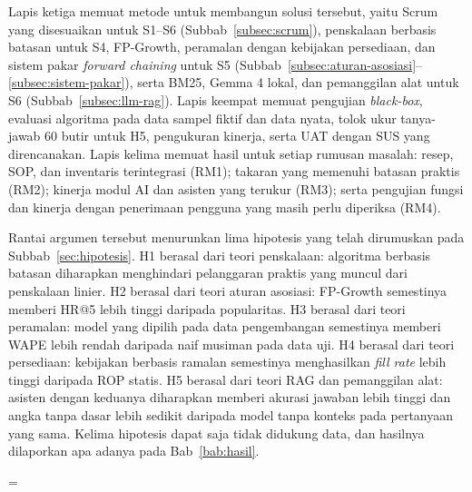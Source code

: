 Lapis ketiga memuat metode untuk membangun solusi tersebut, yaitu Scrum yang disesuaikan untuk S1--S6 (Subbab~\ref{subsec:scrum}), penskalaan berbasis batasan untuk S4, FP-Growth, peramalan dengan kebijakan persediaan, dan sistem pakar \textit{forward chaining} untuk S5 (Subbab~\ref{subsec:aturan-asosiasi}--\ref{subsec:sistem-pakar}), serta BM25, Gemma 4 lokal, dan pemanggilan alat untuk S6 (Subbab~\ref{subsec:llm-rag}). Lapis keempat memuat pengujian \textit{black-box}, evaluasi algoritma pada data sampel fiktif dan data nyata, tolok ukur tanya-jawab 60 butir untuk H5, pengukuran kinerja, serta UAT dengan SUS yang direncanakan. Lapis kelima memuat hasil untuk setiap rumusan masalah: resep, SOP, dan inventaris terintegrasi (RM1); takaran yang memenuhi batasan praktis (RM2); kinerja modul AI dan asisten yang terukur (RM3); serta pengujian fungsi dan kinerja dengan penerimaan pengguna yang masih perlu diperiksa (RM4).

Rantai argumen tersebut menurunkan lima hipotesis yang telah dirumuskan pada Subbab~\ref{sec:hipotesis}. H1 berasal dari teori penskalaan: algoritma berbasis batasan diharapkan menghindari pelanggaran praktis yang muncul dari penskalaan linier. H2 berasal dari teori aturan asosiasi: FP-Growth semestinya memberi HR@5 lebih tinggi daripada popularitas. H3 berasal dari teori peramalan: model yang dipilih pada data pengembangan semestinya memberi WAPE lebih rendah daripada naif musiman pada data uji. H4 berasal dari teori persediaan: kebijakan berbasis ramalan semestinya menghasilkan \textit{fill rate} lebih tinggi daripada ROP statis. H5 berasal dari teori RAG dan pemanggilan alat: asisten dengan keduanya diharapkan memberi akurasi jawaban lebih tinggi dan angka tanpa dasar lebih sedikit daripada model tanpa konteks pada pertanyaan yang sama. Kelima hipotesis dapat saja tidak didukung data, dan hasilnya dilaporkan apa adanya pada Bab~\ref{bab:hasil}.

\righthyphenmin=\babDuaRightHyphenMin\relax
